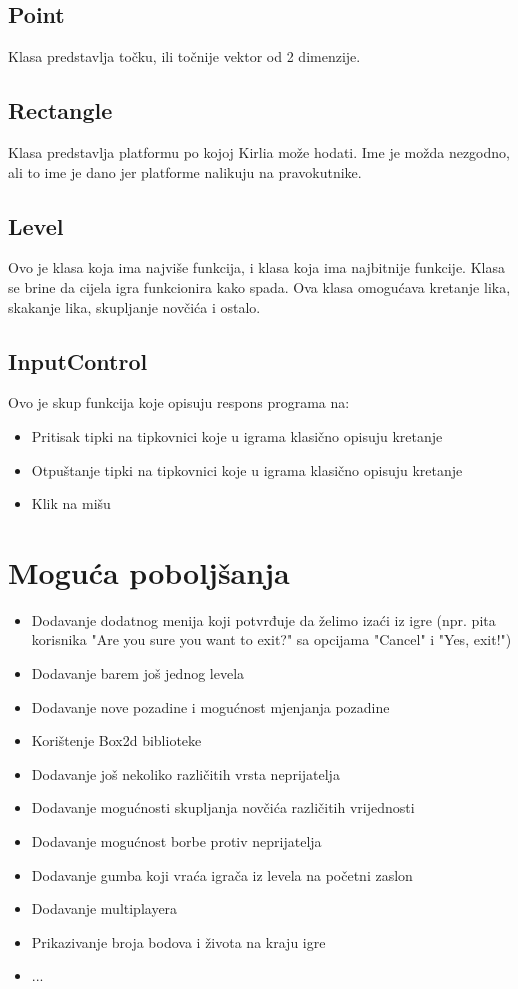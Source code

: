\documentclass[12pt]{article}
\begin{document}
\subsection{Point}
Klasa predstavlja točku, ili točnije vektor od 2 dimenzije.
\subsection{Rectangle}
Klasa predstavlja platformu po kojoj Kirlia može hodati. Ime je možda nezgodno, ali to ime je dano jer platforme nalikuju na pravokutnike. 
\subsection{Level}
Ovo je klasa koja ima najviše funkcija, i klasa koja ima najbitnije funkcije. Klasa se brine da cijela igra funkcionira kako spada. Ova klasa omogućava kretanje lika, skakanje lika, skupljanje novčića i ostalo.
\subsection{InputControl}
Ovo je skup funkcija koje opisuju respons programa na:
\begin{itemize}
\item Pritisak tipki na tipkovnici koje u igrama klasično opisuju kretanje
\item Otpuštanje tipki na tipkovnici koje u igrama klasično opisuju kretanje
\item Klik na mišu
\end{itemize}
\newpage

\section{Moguća poboljšanja}
\begin{itemize}
  \item Dodavanje dodatnog menija koji potvrđuje da želimo izaći iz igre (npr. pita korisnika "Are you sure you want to exit?" sa opcijama "Cancel" i "Yes, exit!")
  \item Dodavanje barem još jednog levela
  \item Dodavanje nove pozadine i mogućnost mjenjanja pozadine
  \item Korištenje Box2d biblioteke 
  \item Dodavanje još nekoliko različitih vrsta neprijatelja
  \item Dodavanje mogućnosti skupljanja novčića različitih vrijednosti
  \item Dodavanje mogućnost borbe protiv neprijatelja
  \item Dodavanje gumba koji vraća igrača iz levela na početni zaslon
  \item Dodavanje multiplayera
  \item Prikazivanje broja bodova i života na kraju igre
  \item ...
\end{itemize}
\newpage
\end{document}
